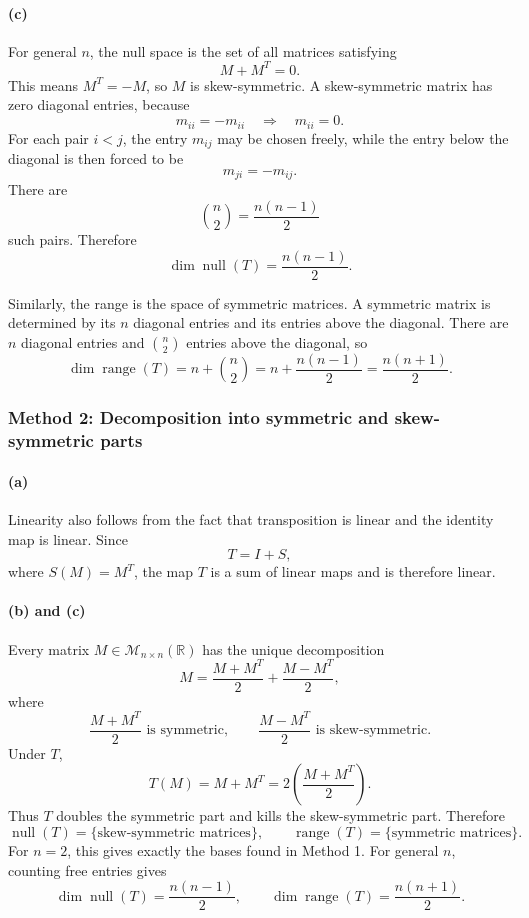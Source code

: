 \documentclass[12pt]{article}
\newcommand{\R}{\mathbb{R}}
\newcommand{\M}{\mathcal{M}}
\newcommand{\Null}{\operatorname{null}}
\newcommand{\Range}{\operatorname{range}}
\begin{document}
\paragraph{(c)}
For general $n$, the null space is the set of all matrices satisfying
\[
M+M^T=0.
\]
This means $M^T=-M$, so $M$ is skew-symmetric. A skew-symmetric matrix has zero diagonal entries, because
\[
m_{ii}=-m_{ii}\quad\Longrightarrow\quad m_{ii}=0.
\]
For each pair $i<j$, the entry $m_{ij}$ may be chosen freely, while the entry below the diagonal is then forced to be
\[
m_{ji}=-m_{ij}.
\]
There are
\[
\binom n2=\frac{n(n-1)}2
\]
such pairs. Therefore
\[
\boxed{\dim\Null(T)=\frac{n(n-1)}2.}
\]

Similarly, the range is the space of symmetric matrices. A symmetric matrix is determined by its $n$ diagonal entries and its entries above the diagonal. There are $n$ diagonal entries and $\binom n2$ entries above the diagonal, so
\[
\dim\Range(T)=n+\binom n2
=n+\frac{n(n-1)}2
=\boxed{\frac{n(n+1)}2}.
\]

\subsubsection{Method 2: Decomposition into symmetric and skew-symmetric parts}

\paragraph{(a)}
Linearity also follows from the fact that transposition is linear and the identity map is linear. Since
\[
T=I+S,
\]
where $S(M)=M^T$, the map $T$ is a sum of linear maps and is therefore linear.

\paragraph{(b) and (c)}
Every matrix $M\in\M_{n\times n}(\R)$ has the unique decomposition
\[
M=\frac{M+M^T}{2}+\frac{M-M^T}{2},
\]
where
\[
\frac{M+M^T}{2}\text{ is symmetric},
\qquad
\frac{M-M^T}{2}\text{ is skew-symmetric}.
\]
Under $T$,
\[
T(M)=M+M^T=2\left(\frac{M+M^T}{2}\right).
\]
Thus $T$ doubles the symmetric part and kills the skew-symmetric part. Therefore
\[
\Null(T)=\{\text{skew-symmetric matrices}\},
\qquad
\Range(T)=\{\text{symmetric matrices}\}.
\]
For $n=2$, this gives exactly the bases found in Method 1. For general $n$, counting free entries gives
\[
\boxed{\dim\Null(T)=\frac{n(n-1)}2,
\qquad
\dim\Range(T)=\frac{n(n+1)}2.}
\]
\end{document}

